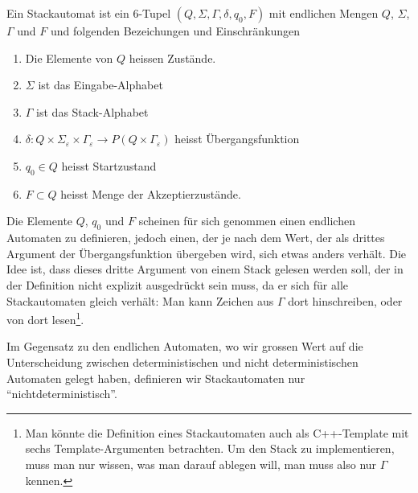 \begin{definition}
%
%
Ein Stackautomat ist ein $6$-Tupel $(Q,\Sigma,\Gamma,\delta,q_0,F)$
mit endlichen Mengen $Q$, $\Sigma$, $\Gamma$ und $F$ und folgenden
Bezeichungen und Einschränkungen
\begin{enumerate}
%
\item Die Elemente von $Q$ heissen Zustände.
%
\item $\Sigma$ ist das Eingabe-Alphabet
%
\item $\Gamma$ ist das Stack-Alphabet
\item $\delta\colon Q\times \Sigma_\varepsilon\times\Gamma_\varepsilon
\to P(Q\times\Gamma_\varepsilon)$ heisst Übergangsfunktion
%
\item $q_0\in Q$ heisst Startzustand
%
\item $F\subset Q$ heisst Menge der Akzeptierzustände.
\end{enumerate}
\end{definition}
Die Elemente $Q$, $q_0$ und $F$ scheinen für sich genommen
einen endlichen Automaten zu definieren, jedoch einen, der je nach
dem Wert, der als drittes Argument der Übergangsfunktion
übergeben wird, sich etwas anders verhält.
Die Idee ist, dass
dieses dritte Argument von einem Stack gelesen werden soll, der in
der Definition nicht explizit ausgedrückt sein muss, da er
sich für alle Stackautomaten gleich verhält: Man kann Zeichen
aus $\Gamma$ dort hinschreiben, oder von dort lesen\footnote{Man könnte
die Definition eines Stackautomaten auch als C++-Template mit
sechs Template-Argumenten betrachten.
Um den Stack zu
implementieren, muss man nur wissen, was man darauf ablegen will,
man muss also nur $\Gamma$ kennen.}.

Im Gegensatz zu den endlichen Automaten, wo wir grossen Wert auf die
Unterscheidung zwischen deterministischen und nicht deterministischen
Automaten gelegt haben, definieren wir Stackautomaten nur
``nichtdeterministisch''.

